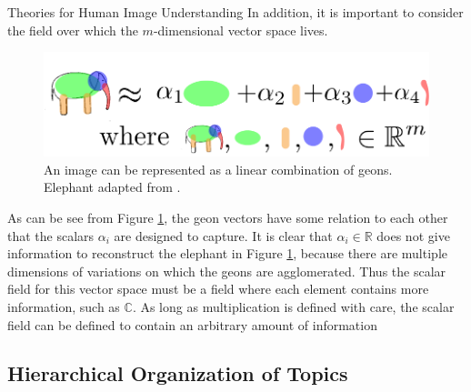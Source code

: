 \documentclass[12pt]{pom_thesis}
\begin{document}
\begin{chapter}{Theories for Human Image Understanding}
In addition, it is important to consider the field over which the $m$-dimensional vector space lives. 
\begin{figure}[h]
	\label{fig:geonLC}
	\centering
	\includegraphics[width=15cm]{geonLC}
	\caption{An image can be represented as a linear combination of geons. Elephant adapted from \cite{biederman1987recognition}.}
\end{figure}
As can be see from Figure \ref{fig:geonLC}, the geon vectors have some relation to each other that the scalars $\alpha_i$ are designed to capture. It is clear that $\alpha_i \in \mathbb{R}$ does not give information  to reconstruct the elephant in Figure \ref{fig:geonLC}, because there are multiple dimensions of variations on which the geons are agglomerated. Thus the scalar field for this vector space must be a field where each element contains more information, such as $\mathbb{C}$. As long as multiplication is defined with care, the scalar field can be defined to contain an arbitrary amount of information 
\subsection*{Hierarchical Organization of Topics}
\end{chapter}
\end{document}
